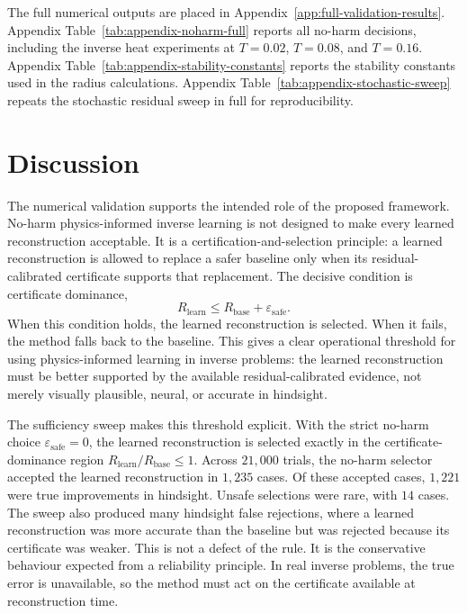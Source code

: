 \documentclass{article}
\numberwithin{equation}{section}
\theoremstyle{definition}
\begin{document}
The full numerical outputs are placed in Appendix~\ref{app:full-validation-results}. Appendix Table~\ref{tab:appendix-noharm-full} reports all no-harm decisions, including the inverse heat experiments at \(T=0.02\), \(T=0.08\), and \(T=0.16\). Appendix Table~\ref{tab:appendix-stability-constants} reports the stability constants used in the radius calculations. Appendix Table~\ref{tab:appendix-stochastic-sweep} repeats the stochastic residual sweep in full for reproducibility.

\section{Discussion}
\label{sec:discussion}

The numerical validation supports the intended role of the proposed framework. No-harm physics-informed inverse learning is not designed to make every learned reconstruction acceptable. It is a certification-and-selection principle: a learned reconstruction is allowed to replace a safer baseline only when its residual-calibrated certificate supports that replacement. The decisive condition is certificate dominance,
\[
R_{\mathrm{learn}}
\le
R_{\mathrm{base}}+\varepsilon_{\mathrm{safe}}.
\]
When this condition holds, the learned reconstruction is selected. When it fails, the method falls back to the baseline. This gives a clear operational threshold for using physics-informed learning in inverse problems: the learned reconstruction must be better supported by the available residual-calibrated evidence, not merely visually plausible, neural, or accurate in hindsight.

The sufficiency sweep makes this threshold explicit. With the strict no-harm choice \(\varepsilon_{\mathrm{safe}}=0\), the learned reconstruction is selected exactly in the certificate-dominance region \(R_{\mathrm{learn}}/R_{\mathrm{base}}\le1\). Across \(21{,}000\) trials, the no-harm selector accepted the learned reconstruction in \(1{,}235\) cases. Of these accepted cases, \(1{,}221\) were true improvements in hindsight. Unsafe selections were rare, with \(14\) cases. The sweep also produced many hindsight false rejections, where a learned reconstruction was more accurate than the baseline but was rejected because its certificate was weaker. This is not a defect of the rule. It is the conservative behaviour expected from a reliability principle. In real inverse problems, the true error is unavailable, so the method must act on the certificate available at reconstruction time.
\end{document}

